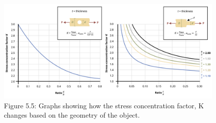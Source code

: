 \documentclass[
  letterpaper,
  DIV=11,
  numbers=noendperiod]{scrreprt}
\begin{document}
\begin{figure}[H]

{\centering \includegraphics{images/PNGs/Figure 5.5.png}

}

\caption{Figure 5.5: Graphs showing how the stress concentration factor,
K changes based on the geometry of the object.}

\end{figure}%
\end{document}
